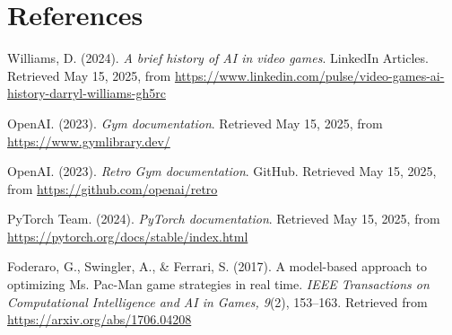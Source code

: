 \section*{References}

Williams, D. (2024). \textit{A brief history of AI in video games}. LinkedIn Articles. Retrieved May 15, 2025, from \url{https://www.linkedin.com/pulse/video-games-ai-history-darryl-williams-gh5rc}

OpenAI. (2023). \textit{Gym documentation}. Retrieved May 15, 2025, from \url{https://www.gymlibrary.dev/}

OpenAI. (2023). \textit{Retro Gym documentation}. GitHub. Retrieved May 15, 2025, from \url{https://github.com/openai/retro}

PyTorch Team. (2024). \textit{PyTorch documentation}. Retrieved May 15, 2025, from \url{https://pytorch.org/docs/stable/index.html}

Foderaro, G., Swingler, A., \& Ferrari, S. (2017). A model-based approach to optimizing Ms. Pac-Man game strategies in real time. \textit{IEEE Transactions on Computational Intelligence and AI in Games, 9}(2), 153--163. Retrieved from \url{https://arxiv.org/abs/1706.04208}
